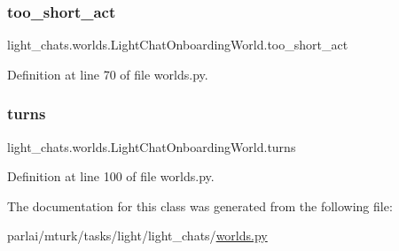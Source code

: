 \subsubsection{\texorpdfstring{too\+\_\+short\+\_\+act}{too\_short\_act}}
{\footnotesize\ttfamily light\+\_\+chats.\+worlds.\+Light\+Chat\+Onboarding\+World.\+too\+\_\+short\+\_\+act\hspace{0.3cm}{\ttfamily [static]}}



Definition at line 70 of file worlds.\+py.

\mbox{\label{classlight__chats_1_1worlds_1_1LightChatOnboardingWorld_a25ce483673ea7734de9f659a3b960c2b}} 
\subsubsection{\texorpdfstring{turns}{turns}}
{\footnotesize\ttfamily light\+\_\+chats.\+worlds.\+Light\+Chat\+Onboarding\+World.\+turns}



Definition at line 100 of file worlds.\+py.



The documentation for this class was generated from the following file\+:\begin{DoxyCompactItemize}
\item 
parlai/mturk/tasks/light/light\+\_\+chats/\hyperlink{parlai_2mturk_2tasks_2light_2light__chats_2worlds_8py}{worlds.\+py}\end{DoxyCompactItemize}
